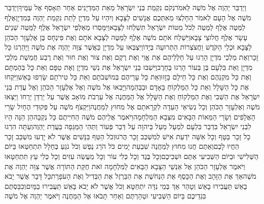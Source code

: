 \documentclass[../main/main.tex]{subfiles}
\begin{document}
\begin{multicols*}{\ncols}
וַיְדַבֵּר יַהְוֶה אֶל מֹשֶׁה לֵּאמֹר\PreVerseSpace{}נְקֹם נִקְמַת בְּנֵי יִשְׂרָאֵל מֵאֵת הַמִּדְיָנִים אַחַר תֵּאָסֵף אֶל עַמֶּיךָ\PreVerseSpace{}וַיְדַבֵּר מֹשֶׁה אֶל הָעָם לֵאמֹר הֵחָלְצוּ מֵאִתְּכֶם אֲנָשִׁים לַצָּבָא וְיִהְיוּ עַל מִדְיָן לָתֵת נִקְמַת יַהְוֶה בְּמִדְיָן\PreVerseSpace{}אֶלֶף לַמַּטֶּה אֶלֶף לַמַּטֶּה לְכֹל מַטּוֹת יִשְׂרָאֵל תִּשְׁלְחוּ לַצָּבָא\PreVerseSpace{}וַיִּמָּסְרוּ מֵאַלְפֵי יִשְׂרָאֵל אֶלֶף לַמַּטֶּה שְׁנֵים עָשָׂר אֶלֶף חֲלוּצֵי צָבָא\PreVerseSpace{}וַיִּשְׁלַח אֹתָם מֹשֶׁה אֶלֶף לַמַּטֶּה לַצָּבָא אֹתָם וְאֶת פִּינְחָס בֶּן אֶלְעָזָר הַכֹּהֵן לַצָּבָא וּכְלֵי הַקֹּדֶשׁ וַחֲצֹצְרוֹת הַתְּרוּעָה בְּיָדוֹ\PreVerseSpace{}וַיִּצְבְּאוּ עַל מִדְיָן כַּאֲשֶׁר צִוָּה יַהְוֶה אֶת מֹשֶׁה וַיַּהַרְגוּ כָּל זָכָר\PreVerseSpace{}וְאֶת מַלְכֵי מִדְיָן הָרְגוּ עַל חַלְלֵיהֶם אֶת אֱוִי וְאֶת רֶקֶם וְאֶת צוּר וְאֶת חוּר וְאֶת רֶבַע חֲמֵשֶׁת מַלְכֵי מִדְיָן וְאֵת בִּלְעָם בֶּן בְּעוֹר הָרְגוּ בֶּחָרֶב\PreVerseSpace{}וַיִּשְׁבּוּ בְנֵי יִשְׂרָאֵל אֶת נְשֵׁי מִדְיָן וְאֶת טַפָּם וְאֵת כָּל בְּהֶמְתָּם וְאֶת כָּל מִקְנֵהֶם וְאֶת כָּל חֵילָם בָּזָזוּ\PreVerseSpace{}וְאֵת כָּל עָרֵיהֶם בְּמוֹשְׁבֹתָם וְאֵת כָּל טִירֹתָם שָׂרְפוּ בָּאֵשׁ\PreVerseSpace{}וַיִּקְחוּ אֶת כָּל הַשָּׁלָל וְאֵת כָּל הַמַּלְקוֹחַ בָּאָדָם וּבַבְּהֵמָה\PreVerseSpace{}וַיָּבִאוּ אֶל מֹשֶׁה וְאֶל אֶלְעָזָר הַכֹּהֵן וְאֶל עֲדַת בְּנֵי יִשְׂרָאֵל אֶת הַשְּׁבִי וְאֶת הַמַּלְקוֹחַ וְאֶת הַשָּׁלָל אֶל הַמַּחֲנֶה אֶל עַרְבֹת מוֹאָב אֲשֶׁר עַל יַרְדֵּן יְרֵחוֹ \ClosedSection{}וַיֵּצְאוּ מֹשֶׁה וְאֶלְעָזָר הַכֹּהֵן וְכָל נְשִׂיאֵי הָעֵדָה לִקְרָאתָם אֶל מִחוּץ לַמַּחֲנֶה\PreVerseSpace{}וַיִּקְצֹף מֹשֶׁה עַל פְּקוּדֵי הֶחָיִל שָׂרֵי הָאֲלָפִים וְשָׂרֵי הַמֵּאוֹת הַבָּאִים מִצְּבָא הַמִּלְחָמָה\PreVerseSpace{}וַיֹּאמֶר אֲלֵיהֶם מֹשֶׁה הַחִיִּיתֶם כָּל נְקֵבָה\PreVerseSpace{}הֵן הֵנָּה הָיוּ לִבְנֵי יִשְׂרָאֵל בִּדְבַר בִּלְעָם לִמְעָל\SubEnd{} מַעַל בַּיהוָה עַל דְּבַר פְּעוֹר וַתְּהִי הַמַּגֵּפָה בַּעֲדַת יַהְוֶה\PreVerseSpace{}וְעַתָּה הִרְגוּ כָל זָכָר בַּטָּף וְכָל אִשָּׁה יֹדַעַת אִישׁ לְמִשְׁכַּב זָכָר הֲרֹגוּ\PreVerseSpace{}וְכֹל הַטַּף בַּנָּשִׁים אֲשֶׁר לֹא יָדְעוּ מִשְׁכַּב זָכָר הַחֲיוּ לָכֶם\PreVerseSpace{}וְאַתֶּם חֲנוּ מִחוּץ לַמַּחֲנֶה שִׁבְעַת יָמִים כֹּל הֹרֵג נֶפֶשׁ וְכֹל נֹגֵעַ בֶּחָלָל תִּתְחַטְּאוּ בַּיּוֹם הַשְּׁלִישִׁי וּבַיּוֹם הַשְּׁבִיעִי אַתֶּם וּשְׁבִיכֶם\PreVerseSpace{}וְכָל בֶּגֶד וְכָל כְּלִי עוֹר וְכָל מַעֲשֵׂה עִזִּים וְכָל כְּלִי עֵץ תִּתְחַטָּאוּ \ClosedSection{}וַיֹּאמֶר אֶלְעָזָר הַכֹּהֵן אֶל אַנְשֵׁי הַצָּבָא הַבָּאִים לַמִּלְחָמָה זֹאת חֻקַּת הַתּוֹרָה אֲשֶׁר צִוָּה יַהְוֶה אֶת מֹשֶׁה\PreVerseSpace{}אַךְ אֶת הַזָּהָב וְאֶת הַכָּסֶף אֶת הַנְּחֹשֶׁת אֶת הַבַּרְזֶל אֶת הַבְּדִיל וְאֶת הָעֹפָרֶת\PreVerseSpace{}כָּל דָּבָר אֲשֶׁר יָבֹא בָאֵשׁ תַּעֲבִירוּ בָאֵשׁ וְטָהֵר אַךְ בְּמֵי נִדָּה יִתְחַטָּא וְכֹל אֲשֶׁר לֹא יָבֹא בָּאֵשׁ תַּעֲבִירוּ בַמָּיִם\PreVerseSpace{}וְכִבַּסְתֶּם בִּגְדֵיכֶם בַּיּוֹם הַשְּׁבִיעִי וּטְהַרְתֶּם וְאַחַר תָּבֹאוּ אֶל הַמַּחֲנֶה \ClosedSection{}וַיֹּאמֶר יַהְוֶה אֶל מֹשֶׁה 
\end{multicols*}
\end{document}

